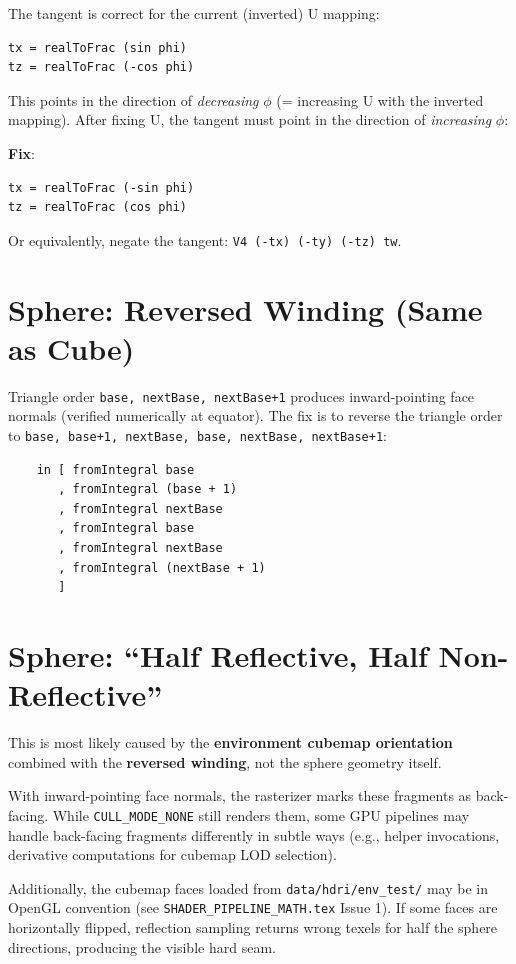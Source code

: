 \documentclass{article}
\begin{document}
The tangent is correct for the current (inverted) U mapping:
\begin{verbatim}
tx = realToFrac (sin phi)
tz = realToFrac (-cos phi)
\end{verbatim}

This points in the direction of \emph{decreasing} $\phi$ (= increasing U with the
inverted mapping). After fixing U, the tangent must point in the direction of
\emph{increasing} $\phi$:

\textbf{Fix}:
\begin{verbatim}
tx = realToFrac (-sin phi)
tz = realToFrac (cos phi)
\end{verbatim}

Or equivalently, negate the tangent: \texttt{V4 (-tx) (-ty) (-tz) tw}.

\section{Sphere: Reversed Winding (Same as Cube)}

Triangle order \texttt{base, nextBase, nextBase+1} produces inward-pointing
face normals (verified numerically at equator). The fix is to reverse the
triangle order to \texttt{base, base+1, nextBase, base, nextBase, nextBase+1}:

\begin{verbatim}
    in [ fromIntegral base
       , fromIntegral (base + 1)
       , fromIntegral nextBase
       , fromIntegral base
       , fromIntegral nextBase
       , fromIntegral (nextBase + 1)
       ]
\end{verbatim}

\section{Sphere: ``Half Reflective, Half Non-Reflective''}

This is most likely caused by the \textbf{environment cubemap orientation} combined
with the \textbf{reversed winding}, not the sphere geometry itself.

With inward-pointing face normals, the rasterizer marks these fragments as
back-facing. While \texttt{CULL\_MODE\_NONE} still renders them, some GPU
pipelines may handle back-facing fragments differently in subtle ways (e.g.,
helper invocations, derivative computations for cubemap LOD selection).

Additionally, the cubemap faces loaded from \texttt{data/hdri/env\_test/} may be
in OpenGL convention (see \texttt{SHADER\_PIPELINE\_MATH.tex} Issue 1). If some
faces are horizontally flipped, reflection sampling returns wrong texels for
half the sphere directions, producing the visible hard seam.
\end{document}
